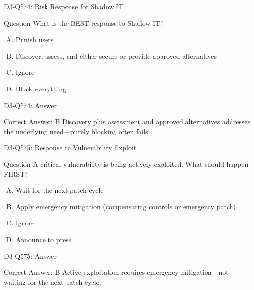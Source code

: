 \documentclass{beamer}
\begin{document}
	\begin{frame}{D3-Q574: Risk Response for Shadow IT}
		\begin{block}{Question}
			What is the BEST response to Shadow IT?
		\end{block}
		\begin{enumerate}[(A)]
			\item Punish users
			\item Discover, assess, and either secure or provide approved alternatives
			\item Ignore
			\item Block everything
		\end{enumerate}
	\end{frame}
	\begin{frame}{D3-Q574: Answer}
		\begin{block}{Correct Answer: B}
			Discovery plus assessment and approved alternatives addresses the underlying need—purely blocking often fails.
		\end{block}
	\end{frame}
	
	\begin{frame}{D3-Q575: Response to Vulnerability Exploit}
		\begin{block}{Question}
			A critical vulnerability is being actively exploited. What should happen FIRST?
		\end{block}
		\begin{enumerate}[(A)]
			\item Wait for the next patch cycle
			\item Apply emergency mitigation (compensating controls or emergency patch)
			\item Ignore
			\item Announce to press
		\end{enumerate}
	\end{frame}
	\begin{frame}{D3-Q575: Answer}
		\begin{block}{Correct Answer: B}
			Active exploitation requires emergency mitigation—not waiting for the next patch cycle.
		\end{block}
	\end{frame}
	
\end{document}
